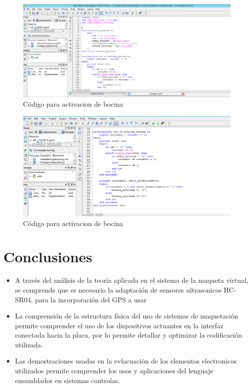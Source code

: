 \documentclass[journal]{IEEEtran}
\begin{document}
\begin{figure}[H]
    \centering
    \includegraphics[scale=0.2]{images/2.png}
    \caption{Código para activacion de bocina}
\end{figure}

\begin{figure}[H]
    \centering
    \includegraphics[scale=0.2]{images/3.png}
    \caption{Código para activacion de bocina}
\end{figure}

\section{Conclusiones}
\begin{itemize}
    \item A través del análisis de la teoría aplicada en el sistema de la maqueta virtual, se comprende que es necesario la adaptación de sensores ultrasonicos HC-SR04, para la incorporación del GPS a usar
    
    \item La comprensión de la estructura física del uso de sistemas de maquetación permite comprender el uso de los dispositivos actuantes en la interfaz conectada hacia la placa, por lo permite detallar y optimizar la codificación utilizada. 
    
    \item Las demostraciones usadas en la evlacuación de los elementos electronicos utilizados permite comprender los usos y aplicaciones del lenguaje ensamblador en sistemas controlas.

\end{itemize}
\end{document}
